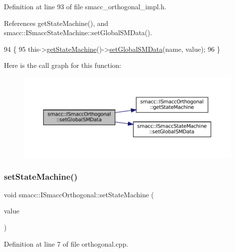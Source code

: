 Definition at line 93 of file smacc\+\_\+orthogonal\+\_\+impl.\+h.



References get\+State\+Machine(), and smacc\+::\+I\+Smacc\+State\+Machine\+::set\+Global\+S\+M\+Data().


\begin{DoxyCode}
94 \{
95     this->\hyperlink{classsmacc_1_1ISmaccOrthogonal_aae265ec480b8ed552ddc79afd2d93a62}{getStateMachine}()->\hyperlink{classsmacc_1_1ISmaccStateMachine_a8588f9e580fbb95b53e2bd2ca3ff1f98}{setGlobalSMData}(name, value);
96 \}
\end{DoxyCode}
Here is the call graph for this function\+:
\nopagebreak
\begin{figure}[H]
\begin{center}
\leavevmode
\includegraphics[width=350pt]{classsmacc_1_1ISmaccOrthogonal_a2b5b15907fa6c7c6882717246f0633ab_cgraph}
\end{center}
\end{figure}
\mbox{\label{classsmacc_1_1ISmaccOrthogonal_a0fa0901a322f62a604c279c06d34f2f0}} 
\subsubsection{\texorpdfstring{set\+State\+Machine()}{setStateMachine()}}
{\footnotesize\ttfamily void smacc\+::\+I\+Smacc\+Orthogonal\+::set\+State\+Machine (\begin{DoxyParamCaption}\item[{\hyperlink{classsmacc_1_1ISmaccStateMachine}{I\+Smacc\+State\+Machine} $\ast$}]{value }\end{DoxyParamCaption})}



Definition at line 7 of file orthogonal.\+cpp.



